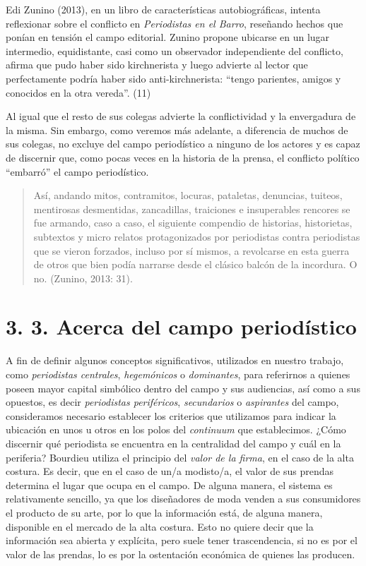 Edi Zunino (2013), en un libro de características autobiográficas, intenta reflexionar sobre el conflicto en \emph{Periodistas en el Barro}, reseñando hechos que ponían en tensión el campo editorial. Zunino propone ubicarse en un lugar intermedio, equidistante, casi como un observador independiente del conflicto, afirma que pudo haber sido kirchnerista y luego advierte al lector que perfectamente podría haber sido anti-kirchnerista: \enquote{tengo parientes, amigos y conocidos en la otra vereda}. (11)

Al igual que el resto de sus colegas advierte la conflictividad y la envergadura de la misma. Sin embargo, como veremos más adelante, a diferencia de muchos de sus colegas, no excluye del campo periodístico a ninguno de los actores y es capaz de discernir que, como pocas veces en la historia de la prensa, el conflicto político \enquote{embarró} el campo periodístico.

\begin{quote}
Así, andando mitos, contramitos, locuras, pataletas, denuncias, tuiteos, mentirosas desmentidas, zancadillas, traiciones e insuperables rencores se fue armando, caso a caso, el siguiente compendio de historias, historietas, subtextos y micro relatos protagonizados por periodistas contra periodistas que se vieron forzados, incluso por sí mismos, a revolcarse en esta guerra de otros que bien podía narrarse desde el clásico balcón de la incordura. O no. (Zunino, 2013: 31).
\end{quote}

\section{3. 3. Acerca del campo periodístico}

A fin de definir algunos conceptos significativos, utilizados en nuestro trabajo, como \emph{periodistas centrales}, \emph{hegemónicos} o \emph{dominantes}, para referirnos a quienes poseen mayor capital simbólico dentro del campo y sus audiencias, así como a sus opuestos, es decir \emph{periodistas periféricos}, \emph{secundarios} o \emph{aspirantes} del campo, consideramos necesario establecer los criterios que utilizamos para indicar la ubicación en unos u otros en los polos del \emph{continuum} que establecimos. ¿Cómo discernir qué periodista se encuentra en la centralidad del campo y cuál en la periferia? Bourdieu utiliza el principio del \emph{valor de la firma}, en el caso de la alta costura. Es decir, que en el caso de un/a modisto/a, el valor de sus prendas determina el lugar que ocupa en el campo. De alguna manera, el sistema es relativamente sencillo, ya que los diseñadores de moda venden a sus consumidores el producto de su arte, por lo que la información está, de alguna manera, disponible en el mercado de la alta costura. Esto no quiere decir que la información sea abierta y explícita, pero suele tener trascendencia, si no es por el valor de las prendas, lo es por la ostentación económica de quienes las producen.

